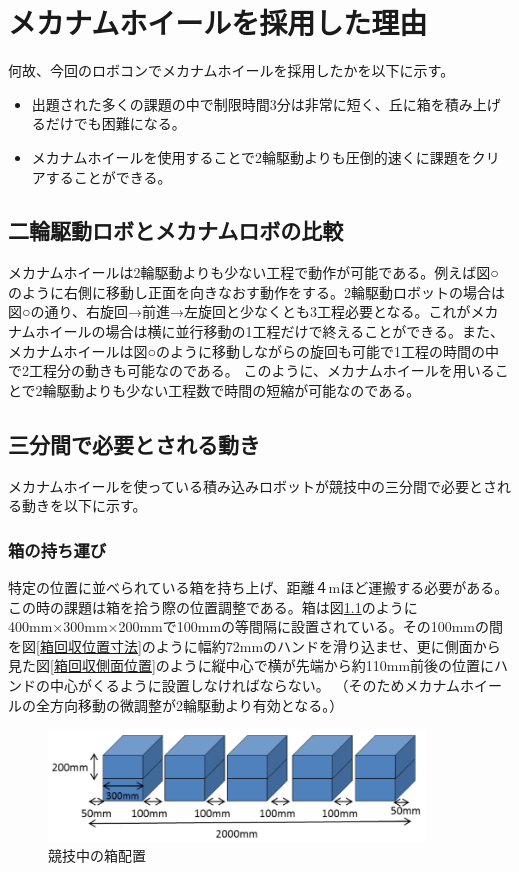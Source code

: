 \documentclass[12pt,oneside]{sotsuken_paper}
\begin{document}
\chapter{メカナムホイールを採用した理由}
何故、今回のロボコンでメカナムホイールを採用したかを以下に示す。

\begin{itemize}
	\item 出題された多くの課題の中で制限時間3分は非常に短く、丘に箱を積み上げるだけでも困難になる。
	\item メカナムホイールを使用することで2輪駆動よりも圧倒的速くに課題をクリアすることができる。
\end{itemize}

	\section{二輪駆動ロボとメカナムロボの比較}
	メカナムホイールは2輪駆動よりも少ない工程で動作が可能である。例えば図○のように右側に移動し正面を向きなおす動作をする。2輪駆動ロボットの場合は図○の通り、右旋回→前進→左旋回と少なくとも3工程必要となる。これがメカナムホイールの場合は横に並行移動の1工程だけで終えることができる。また、メカナムホイールは図○のように移動しながらの旋回も可能で1工程の時間の中で2工程分の動きも可能なのである。
このように、メカナムホイールを用いることで2輪駆動よりも少ない工程数で時間の短縮が可能なのである。

	\section{三分間で必要とされる動き}
	メカナムホイールを使っている積み込みロボットが競技中の三分間で必要とされる動きを以下に示す。

		\subsection{箱の持ち運び}
		特定の位置に並べられている箱を持ち上げ、距離４mほど運搬する必要がある。この時の課題は箱を拾う際の位置調整である。箱は図\ref{ブロック}のように400mm×300mm×200mmで100mmの等間隔に設置されている。その100mmの間を図\ref{箱回収位置寸法}のように幅約72mmのハンドを滑り込ませ、更に側面から見た図\ref{箱回収側面位置}のように縦中心で横が先端から約110mm前後の位置にハンドの中心がくるように設置しなければならない。
（そのためメカナムホイールの全方向移動の微調整が2輪駆動より有効となる。）

		\begin{figure}[htp]
			\begin{center}
				\includegraphics[width=100mm]{Image/ブロック.png}
				\caption{競技中の箱配置}
				\label{ブロック}
			\end{center}
		\end{figure}
\end{document}
